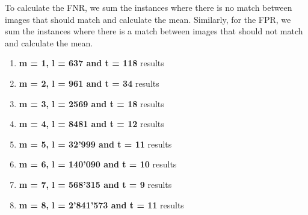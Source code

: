 To calculate the FNR, we sum the instances where there is no match between images that should match and calculate the mean. Similarly, for the FPR, we sum the instances where there is a match between images that should not match and calculate the mean.

\begin{enumerate}
    \item \textbf{m = 1, l = 637 and t = 118}
    results
    \item \textbf{m = 2, l = 961 and t = 34}
    results
    \item \textbf{m = 3, l = 2569 and t = 18}
    results
    \item \textbf{m = 4, l = 8481 and t = 12}
    results
    \item \textbf{m = 5, l = 32'999 and t = 11}
    results
    \item \textbf{m = 6, l = 140'090 and t = 10}
    results
    \item \textbf{m = 7, l = 568'315 and t = 9}
    results
    \item \textbf{m = 8, l = 2'841'573 and t = 11}
    results
\end{enumerate}

